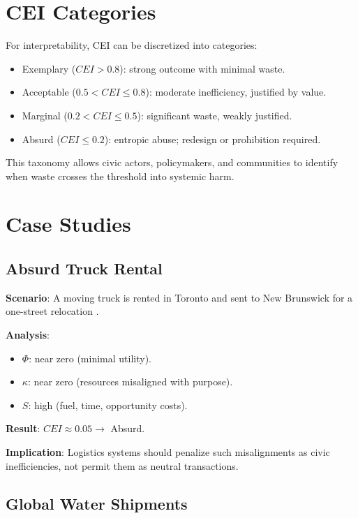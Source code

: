 \documentclass[openany]{book}
\begin{document}
\section{CEI Categories}

For interpretability, CEI can be discretized into categories:

\begin{itemize}
    \item Exemplary ($CEI > 0.8$): strong outcome with minimal waste.
    \item Acceptable ($0.5 < CEI \leq 0.8$): moderate inefficiency, justified by value.
    \item Marginal ($0.2 < CEI \leq 0.5$): significant waste, weakly justified.
    \item Absurd ($CEI \leq 0.2$): entropic abuse; redesign or prohibition required.
\end{itemize}

This taxonomy allows civic actors, policymakers, and communities to identify when waste crosses the threshold into systemic harm.

\section{Case Studies}

\subsection{Absurd Truck Rental}

\textbf{Scenario}: A moving truck is rented in Toronto and sent to New Brunswick for a one-street relocation \cite{toronto2025}.

\textbf{Analysis}:

\begin{itemize}
    \item $\Phi$: near zero (minimal utility).
    \item $\kappa$: near zero (resources misaligned with purpose).
    \item $S$: high (fuel, time, opportunity costs).
\end{itemize}

\textbf{Result}: $CEI \approx 0.05 \rightarrow$ Absurd.

\textbf{Implication}: Logistics systems should penalize such misalignments as civic inefficiencies, not permit them as neutral transactions.

\subsection{Global Water Shipments}
\end{document}
